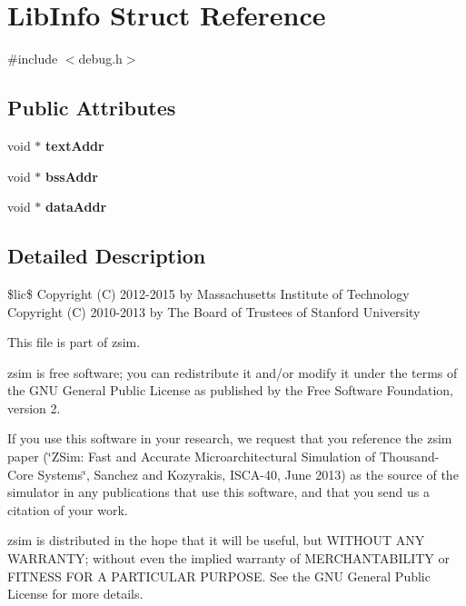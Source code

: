 \hypertarget{structLibInfo}{\section{Lib\-Info Struct Reference}
\label{structLibInfo}
}


{\ttfamily \#include $<$debug.\-h$>$}

\subsection*{Public Attributes}
\begin{DoxyCompactItemize}
\item 
\hypertarget{structLibInfo_ad2947a47d9594007b1c3e5de18568ae3}{void $\ast$ {\bfseries text\-Addr}}\label{structLibInfo_ad2947a47d9594007b1c3e5de18568ae3}

\item 
\hypertarget{structLibInfo_a95f9363463840d7286bb31e26aeb504f}{void $\ast$ {\bfseries bss\-Addr}}\label{structLibInfo_a95f9363463840d7286bb31e26aeb504f}

\item 
\hypertarget{structLibInfo_ae0a1155e0ad949415358d8f5b2ca8c1b}{void $\ast$ {\bfseries data\-Addr}}\label{structLibInfo_ae0a1155e0ad949415358d8f5b2ca8c1b}

\end{DoxyCompactItemize}


\subsection{Detailed Description}
\$lic\$ Copyright (C) 2012-\/2015 by Massachusetts Institute of Technology Copyright (C) 2010-\/2013 by The Board of Trustees of Stanford University

This file is part of zsim.

zsim is free software; you can redistribute it and/or modify it under the terms of the G\-N\-U General Public License as published by the Free Software Foundation, version 2.

If you use this software in your research, we request that you reference the zsim paper (\char`\"{}\-Z\-Sim\-: Fast and Accurate Microarchitectural Simulation of
\-Thousand-\/\-Core Systems\char`\"{}, Sanchez and Kozyrakis, I\-S\-C\-A-\/40, June 2013) as the source of the simulator in any publications that use this software, and that you send us a citation of your work.

zsim is distributed in the hope that it will be useful, but W\-I\-T\-H\-O\-U\-T A\-N\-Y W\-A\-R\-R\-A\-N\-T\-Y; without even the implied warranty of M\-E\-R\-C\-H\-A\-N\-T\-A\-B\-I\-L\-I\-T\-Y or F\-I\-T\-N\-E\-S\-S F\-O\-R A P\-A\-R\-T\-I\-C\-U\-L\-A\-R P\-U\-R\-P\-O\-S\-E. See the G\-N\-U General Public License for more details.

